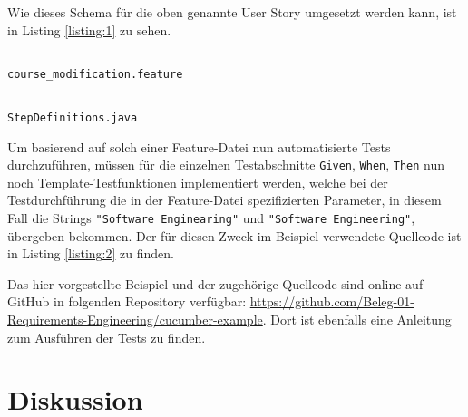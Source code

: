 \documentclass[acmtog]{acmart}
\begin{document}
\vspace*{-1em}
Wie dieses Schema für die oben genannte User Story umgesetzt werden kann, ist in Listing \ref{listing:1} zu sehen.

\begin{listing}[!h]
	\begin{tcolorbox}[colframe=black, colback=white, opacityback=1.0, sharp corners, boxrule=.4pt, width=\linewidth]
		\vspace*{-.6em}
		\inputminted[xleftmargin=-12pt, xrightmargin=-18pt]{cucumber}{cucumber/course_modification.feature}
		\vspace*{-1em}
	\end{tcolorbox}
	\vspace*{-1em}
	\caption{\texttt{course\_modification.feature}}
	\label{listing:1}
\end{listing}


\begin{listing}[!h]
	\begin{tcolorbox}[colframe=black, colback=white, opacityback=1.0, sharp corners, boxrule=.4pt, width=\linewidth-.8pt]
		\vspace{-.6em}
		\inputminted[linenos, firstline=9, breakafter=_, xleftmargin=2pt, numbersep=6pt, frame=none]{java}{cucumber/StepDefinitions.java}
		\vspace{-1em}
	\end{tcolorbox}
	\vspace{-1em}
	\caption{\texttt{StepDefinitions.java}}
	\label{listing:2}
\end{listing}

Um basierend auf solch einer Feature-Datei nun automatisierte Tests durchzuführen, müssen für die einzelnen Testabschnitte
\texttt{Given}, \texttt{When}, \texttt{Then} nun noch Template-Testfunktionen implementiert werden, welche bei der Testdurchführung
die in der Feature-Datei spezifizierten Parameter, in diesem Fall die Strings \texttt{"{}Software Enginearing"{}} und
\texttt{"{}Software Engineering"{}}, übergeben bekommen.
Der für diesen Zweck im Beispiel verwendete Quellcode ist in Listing \ref{listing:2} zu finden.

Das hier vorgestellte Beispiel und der zugehörige Quellcode sind online auf GitHub in folgenden Repository verfügbar:
\url{https://github.com/Beleg-01-Requirements-Engineering/cucumber-example}.
Dort ist ebenfalls eine Anleitung zum Ausführen der Tests zu finden.


\section{Diskussion} \label{sec:diskussion}
\end{document}
